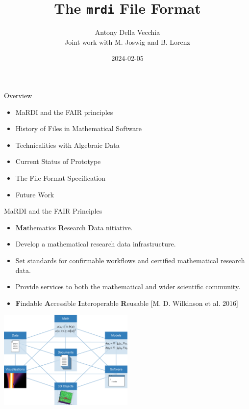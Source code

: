 \documentclass[9pt]{beamer}
\author[Antony Della Vecchia]{Antony Della Vecchia \\ \vspace{4mm} \small{Joint work with M. Joswig and B. Lorenz} }
\title{The \texttt{mrdi} File Format}
\institute[]{
Technische Universit\"at Berlin
}
\date{
  2024-02-05
}
\theoremstyle{definition}
\begin{document}
\maketitle


\begin{frame}[fragile]{Overview}
  \begin{itemize}
  \item MaRDI and the FAIR principles
  \item History of Files in Mathematical Software
  \item Technicalities with Algebraic Data
  \item Current Status of Prototype
  \item The File Format Specification
  \item Future Work
  \end{itemize}
\end{frame}



\begin{frame}[fragile]{MaRDI and the FAIR Principles}
  \begin{itemize}
  \item \textbf{Ma}thematics \textbf{R}esearch \textbf{D}ata nitiative.
  \item Develop a mathematical research data infrastructure.
  \item Set standards for confirmable workflows and certified mathematical research data.
  \item Provide services to both the mathematical and wider scientific community.
  \item \textbf{F}indable \textbf{A}ccessible \textbf{I}nteroperable \textbf{R}eusable [M. D. Wilkinson et al. 2016]

  \end{itemize}
  \begin{center}
    \includegraphics[width=0.5\textwidth, height=0.5\textheight]{images/graph}
  \end{center}
\end{frame}
\end{document}
